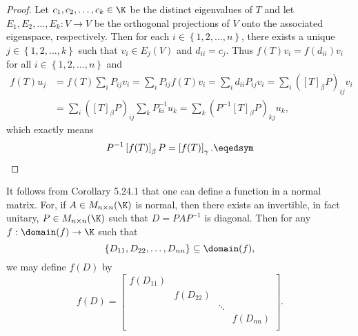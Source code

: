 \documentclass[linearalgebraII]{subfiles}
\begin{document}
    \begin{proof}
        Let $c_1,c_2,\ldots,c_k\in\K$ be the distinct eigenvalues of $T$ and let $E_1,E_2,\ldots,E_k:V\to V$ be the orthogonal projections of $V$ onto the associated eigenspace, respectively. Then for each $i\in\left\lbrace 1,2,\ldots,n \right\rbrace$, there exists a unique $j\in\left\lbrace 1,2,\ldots,k \right\rbrace$ such that $v_i\in E_j(V)$ and $d_{ii} = c_j$. Thus $f(T)v_i = f\left( d_{ii} \right) v_i$ for all $i\in\left\lbrace 1,2,\ldots,n \right\rbrace$ and
        \begin{align*}
            f(T)u_j & = f(T)\sum^{}_{i} P_{ij}v_i = \sum^{}_{i} P_{ij}f(T)v_i = \sum^{}_{i} d_{ii}P_{ij}v_i = \sum^{}_{i} \left( \left[ T \right] _\beta P \right) _{ij}v_i \\
                    & = \sum^{}_{i} \left( \left[ T \right] _\beta P \right)_{ij} \sum^{}_{k} P^{-1}_{ki}u_k = \sum^{}_{k} \left( P^{-1}\left[ T \right] _\beta P \right) _{kj}u_k,
        \end{align*} 
        which exactly means
        \begin{equation*}
            P^{-1}\left[ f(T) \right] _\beta P = \left[ f(T) \right] _\gamma. \eqedsym
        \end{equation*}
    \end{proof}

    \begin{remark}
        It follows from Corollary 5.24.1 that one can define a function in a normal matrix. For, if $A\in M_{n\times n}(\K)$ is normal, then there exists an invertible, in fact unitary, $P\in M_{n\times n}(\K)$ such that $D = PAP^{-1}$ is diagonal. Then for any $f:\domain(f)\to\K$ such that
        \begin{equation*}
            \left\lbrace D_{11},D_{22},\ldots,D_{nn} \right\rbrace \subseteq\domain(f),
        \end{equation*}
        we may define $f(D)$ by
        \begin{equation*}
            f(D) = 
            \begin{bmatrix}
                f\left( D_{11} \right) & & & \\
                & f\left( D_{22} \right) & & \\
                & & \ddots& \\
                & & & f\left( D_{nn} \right) \\
            \end{bmatrix}.
        \end{equation*}
    \end{remark}
\end{document}
